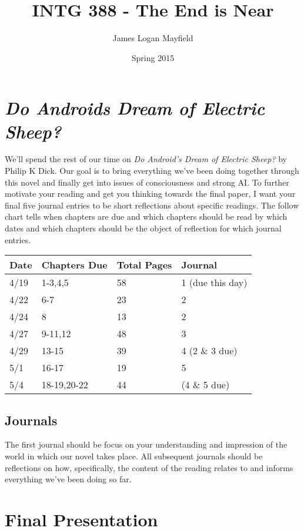 \documentclass[]{tufte-handout}
\title{INTG 388 - The End is Near }
\author{James Logan Mayfield}
\date{ Spring 2015 }
\begin{document}
\maketitle

\section{ \textit{Do Androids Dream of Electric Sheep?} }

We'll spend the rest of our time on \textit{Do Android's Dream of Electric Sheep?}\cite{dick_androids_2008} by Philip K Dick. Our goal is to bring everything we've been doing together through this novel and finally get into issues of consciousness and strong AI. To further motivate your reading and get you thinking towards the final paper, I want your final five journal entries to be short reflections about specific readings. The follow chart tells when chapters are due and which chapters should be read by which dates and which chapters should be the object of reflection for which journal entries. 

\begin{center}
\begin{tabular}{llll}
Date & Chapters Due & Total Pages & Journal \\ \hline
4/19 & 1-3,4,5 & 58 & 1 (due this day)\\
4/22 & 6-7 & 23 & 2 \\
4/24 & 8 & 13 & 2 \\
4/27 & 9-11,12 & 48 & 3 \\
4/29 & 13-15 & 39 & 4 (2 \& 3 due)\\
5/1 & 16-17 & 19 & 5 \\
5/4 & 18-19,20-22 & 44 &  (4 \& 5 due)
\end{tabular}
\end{center}

\subsection{Journals}

The first journal should be focus on your understanding and impression of the world in which our novel takes place. All subsequent journals should be reflections on how, specifically, the content of the reading relates to and informs everything we've been doing so far. 

\section{Final Presentation}
\end{document}
